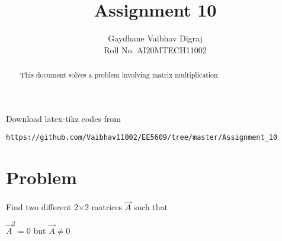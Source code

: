 \documentclass[journal,12pt,twocolumn]{IEEEtran}
\begin{document}
     \def\rightbox#1{\makebox[0in][r]{#1}}
     \def\centbox#1{\makebox[0in]{#1}}
     \def\topbox#1{\raisebox{-\baselineskip}[0in][0in]{#1}}
     \def\midbox#1{\raisebox{-0.5\baselineskip}[0in][0in]{#1}}
\vspace{3cm}
\title{Assignment 10}
\author{Gaydhane Vaibhav Digraj \\ Roll No. AI20MTECH11002}
\maketitle
\newpage
\bigskip
\renewcommand{\thefigure}{\theenumi}
\renewcommand{\thetable}{\theenumi}
\begin{abstract}
This document solves a problem involving matrix multiplication.
\end{abstract}
%
Download latex-tikz codes from 
%
\begin{lstlisting}
https://github.com/Vaibhav11002/EE5609/tree/master/Assignment_10
\end{lstlisting}
%
\section{Problem}
Find two different 2$\times$2 matrices $\vec{A}$ such that 

$\vec{A}^{2}=0$ but $\vec{A}\ne0$
\end{document}
